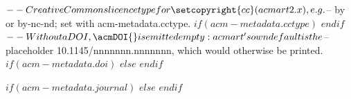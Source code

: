 $-- Creative Commons licence type for \setcopyright{cc} (acmart 2.x), e.g.
$-- by or by-nc-nd; set with acm-metadata.cctype.
$if(acm-metadata.cctype)$
$endif$
$-- Without a DOI, \acmDOI{} is emitted empty: acmart's own default is the
$-- placeholder 10.1145/nnnnnnn.nnnnnnn, which would otherwise be printed.
$if(acm-metadata.doi)$
$else$
\acmDOI{}
$endif$

$if(acm-metadata.journal)$
$else$
$endif$





